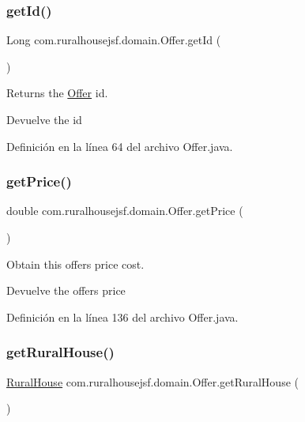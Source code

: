 \subsubsection{\texorpdfstring{getId()}{getId()}}
{\footnotesize\ttfamily Long com.\+ruralhousejsf.\+domain.\+Offer.\+get\+Id (\begin{DoxyParamCaption}{ }\end{DoxyParamCaption})}

Returns the \mbox{\hyperlink{classcom_1_1ruralhousejsf_1_1domain_1_1_offer}{Offer}} id.

\begin{DoxyReturn}{Devuelve}
the id 
\end{DoxyReturn}


Definición en la línea 64 del archivo Offer.\+java.

\mbox{\label{classcom_1_1ruralhousejsf_1_1domain_1_1_offer_a498e3f0617a7a097d68857ce20e6addd}} 
\subsubsection{\texorpdfstring{getPrice()}{getPrice()}}
{\footnotesize\ttfamily double com.\+ruralhousejsf.\+domain.\+Offer.\+get\+Price (\begin{DoxyParamCaption}{ }\end{DoxyParamCaption})}

Obtain this offers price cost.

\begin{DoxyReturn}{Devuelve}
the offers price 
\end{DoxyReturn}


Definición en la línea 136 del archivo Offer.\+java.

\mbox{\label{classcom_1_1ruralhousejsf_1_1domain_1_1_offer_a431afac3e582055bb908b715f2d22bdd}} 
\subsubsection{\texorpdfstring{getRuralHouse()}{getRuralHouse()}}
{\footnotesize\ttfamily \mbox{\hyperlink{classcom_1_1ruralhousejsf_1_1domain_1_1_rural_house}{Rural\+House}} com.\+ruralhousejsf.\+domain.\+Offer.\+get\+Rural\+House (\begin{DoxyParamCaption}{ }\end{DoxyParamCaption})}

